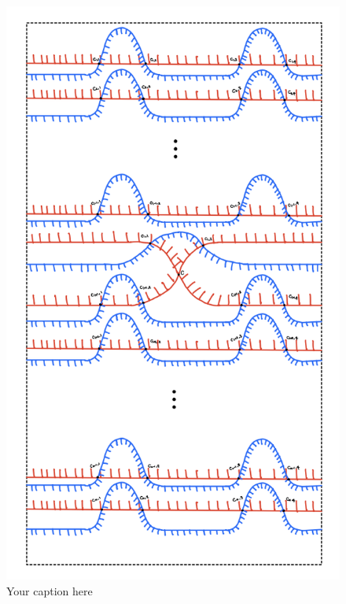\begin{figure}[H] %
    \centering
    \includegraphics[scale = 0.95]{diagrams/local_systems_on_as_diagrams/1-2.png} %
    \caption{Your caption here}
    \label{fig:your-label}
\end{figure}

